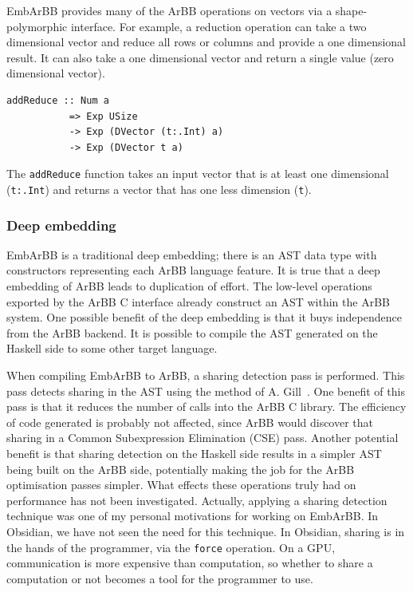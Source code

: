 \documentclass[a4paper]{book}
\begin{document}
EmbArBB provides many of the ArBB operations on vectors via a 
shape-polymorphic interface. For example, a reduction operation can take a two  
dimensional vector and reduce all rows or columns and provide a one dimensional result. 
It can also take a one dimensional vector and return a single value (zero dimensional vector). 

\begin{verbatim} 
addReduce :: Num a 
           => Exp USize 
           -> Exp (DVector (t:.Int) a) 
           -> Exp (DVector t a) 
\end{verbatim} 

The {\tt addReduce} function takes an input vector that is at least one dimensional 
({\tt t:.Int}) and returns a vector that has one less dimension ({\tt t}).
 
\subsubsection{Deep embedding}

EmbArBB is a traditional deep embedding; there is an AST data type with constructors 
representing each ArBB language feature. It is true that a deep embedding of ArBB 
leads to duplication of effort. The low-level operations exported by the 
ArBB C interface already construct an AST within the ArBB system. One possible benefit 
of the deep embedding is that it buys independence from the ArBB backend. It is possible 
to compile the AST generated on the Haskell side to some other target language. 

When compiling EmbArBB to ArBB, a sharing detection pass is performed. This pass detects 
sharing in the AST using the method of A. Gill~\citet{Gill}. One benefit of this pass 
is that it reduces the number of calls into the ArBB C library. The efficiency of code 
generated is probably not affected, since ArBB would discover that sharing in a Common 
Subexpression Elimination (CSE) pass. Another potential benefit is that sharing detection 
on the Haskell side results in a simpler AST being built on the ArBB side, potentially making 
the job for the ArBB optimisation passes simpler. What effects these 
operations truly had on performance has not been investigated. Actually, applying a sharing 
detection technique was one of my personal motivations for working on EmbArBB. In Obsidian, 
we have not seen the need for this technique. In Obsidian, sharing is in the hands of the 
programmer, via the {\tt force} operation. On a GPU, communication is more expensive than 
computation, so whether to share a computation or not becomes a tool for the programmer to use. 
\end{document}

